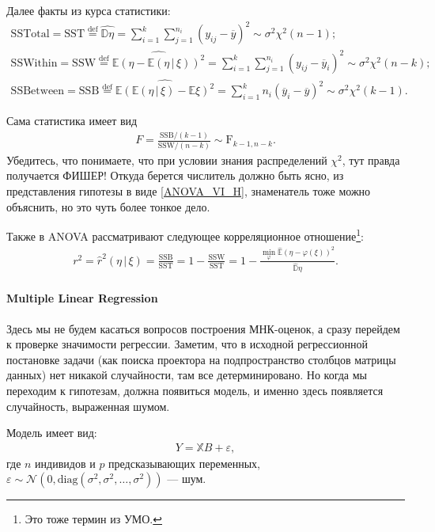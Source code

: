 Далее факты из курса статистики:
\begin{gather*}
    \mathrm {SS Total} = \mathrm {SST} \overset{\mathrm{def}}{=} \widehat{\mathbb D \eta} = \sum_{i=1}^k \sum_{j=1}^{n_i} (y_{ij} - \overline y)^2 \sim \mathcal \sigma^2 \chi^2 (n - 1);\\
    \mathrm {SS Within} = \mathrm {SSW} \overset{\mathrm{def}}{=} \widehat{\mathbb E(\eta - \mathbb E(\eta\, | \, \xi))^2} = \sum_{i=1}^k \sum_{j=1}^{n_i} (y_{ij} - \overline y_i)^2\sim \sigma^2 \mathcal \chi^2 (n - k);\\
    \mathrm {SS Between} = \mathrm {SSB} \overset{\mathrm{def}}{=} \widehat{\mathbb E(\mathbb E(\eta\, | \, \xi) - \mathbb E \xi)^2} = \sum_{i=1}^k n_i (\overline y_i - \overline y)^2 \sim \sigma^2 \mathcal \chi^2 (k - 1).
\end{gather*}

Сама статистика имеет вид
\begin{gather*}
    F = \frac{\mathrm{SSB} / (k - 1)}{\mathrm{SSW} / (n - k)} \sim \mathrm F_{k-1,n-k}.
\end{gather*}
Убедитесь, что понимаете, что при условии знания распределений $\chi^2$, тут правда получается ФИШЕР!
Откуда берется числитель должно быть ясно, из представления гипотезы в виде \eqref{ANOVA_VI_H}, знаменатель тоже можно объяснить, но это чуть более тонкое дело.

Также в ANOVA рассматривают следующее корреляционное отношение\footnote{Это тоже термин из УМО.}:
\begin{gather}
    \label{ANOVA_cor}
    r^2 = \hat r^2(\eta \, | \, \xi) = \mathrm{\frac{SSB}{SST}} = 1 - \mathrm{\frac{SSW}{SST}} = 1 - \frac{\min_{\varphi} \widehat {\mathbb E}(\eta - \varphi(\xi))^2}{\widehat {\mathbb D} \eta}.
\end{gather}

\paragraph{Multiple Linear Regression}
Здесь мы не будем касаться вопросов построения МНК-оценок, а сразу перейдем к проверке значимости регрессии.
Заметим, что в исходной регрессионной постановке задачи (как поиска проектора на подпространство столбцов матрицы данных) нет никакой случайности, там все детерминировано.
Но когда мы переходим к гипотезам, должна появиться модель, и именно здесь появляется случайность, выраженная шумом.

Модель имеет вид:
\begin{gather*}
    Y = \mathbb X B + \varepsilon,
\end{gather*}
где $n$ индивидов и $p$ предсказывающих переменных, $\varepsilon \sim \mathcal N(0, \mathrm {diag}(\sigma^2, \sigma^2, \ldots, \sigma^2))$ --- шум.


